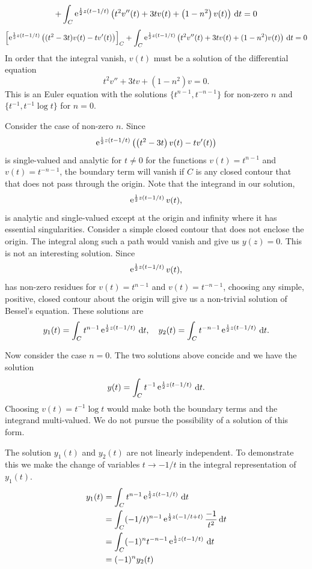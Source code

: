 {\begin{Solution}
\begin{multline*}
    \\
    + \int_C \mathop{\mathrm{e}}\nolimits^{ \frac{1}{2} z (t - 1/t) } \left(
      t^2 v''(t) + 3 t v(t) + \left( 1-n^2 \right) v(t)
    \right) \,\mathrm{d} t = 0
  \end{multline*}
  \[
    \left[ \mathop{\mathrm{e}}\nolimits^{ \frac{1}{2} z (t - 1/t) }
      \left( (t^2 - 3 t) v(t) - t v'(t) \right) \right]_C
    + \int_C \mathop{\mathrm{e}}\nolimits^{ \frac{1}{2} z (t - 1/t) } \left(
      t^2 v''(t) + 3 t v(t) + (1-n^2) v(t) \right) \,\mathrm{d} t = 0
  \]
  In order that the integral vanish, $v(t)$ must be a solution of the
  differential equation
  \[
  t^2 v'' + 3 t v + \left( 1 - n^2 \right) v = 0.
  \]
  This is an Euler equation with the solutions $\{ t^{n-1}, t^{-n-1} \}$
  for non-zero $n$ and $\{ t^{-1}, t^{-1} \log t \}$ for $n = 0$.

  Consider the case of non-zero $n$.  Since
  \[
  \mathop{\mathrm{e}}\nolimits^{ \frac{1}{2} z (t - 1/t) } \left( \left( t^2 - 3 t \right) v(t) - t v'(t) \right)
  \]
  is single-valued and analytic for $t \neq 0$ for the functions
  $v(t) = t^{n-1}$ and $v(t) = t^{-n-1}$, the boundary
  term will vanish if $C$ is any closed contour that that does not pass
  through the origin.  Note that the integrand in our solution,
  \[
  \mathop{\mathrm{e}}\nolimits^{ \frac{1}{2} z (t - 1/t) } v(t),
  \]
  is analytic and single-valued except at the origin and infinity where
  it has essential singularities.  Consider a simple closed contour that
  does not enclose the origin.  The integral along such a path would vanish
  and give us $y(z) = 0$.  This is not an interesting solution.
  Since
  \[
  \mathop{\mathrm{e}}\nolimits^{ \frac{1}{2} z (t - 1/t) } v(t),
  \]
  has non-zero residues for $v(t) = t^{n-1}$ and $v(t) = t^{-n-1}$, choosing
  any simple, positive, closed contour about the origin will give us
  a non-trivial solution of Bessel's equation.  These solutions are
  \[
  y_1(t) = \int_C t^{n-1} \mathop{\mathrm{e}}\nolimits^{ \frac{1}{2} z (t - 1/t) }\,\mathrm{d} t,
  \quad
  y_2(t) = \int_C t^{-n-1} \mathop{\mathrm{e}}\nolimits^{ \frac{1}{2} z (t - 1/t) }\,\mathrm{d} t.
  \]

  Now consider the case $n = 0$.  The two solutions above concide and we
  have the solution
  \[
  y(t) = \int_C t^{-1} \mathop{\mathrm{e}}\nolimits^{ \frac{1}{2} z (t - 1/t) }\,\mathrm{d} t.
  \]
  Choosing $v(t) = t^{-1} \log t$ would make both the boundary terms and
  the integrand multi-valued.   We do not pursue the possibility of a
  solution of this form.

  The solution $y_1(t)$ and $y_2(t)$ are not linearly independent.  To
  demonstrate this we make the change of variables $t \to -1/t$ in the
  integral representation of $y_1(t)$.
  \begin{align*}
    y_1(t)
    &= \int_C t^{n-1} \mathop{\mathrm{e}}\nolimits^{ \frac{1}{2} z (t - 1/t) }\,\mathrm{d} t 
    \\
    &= \int_C (-1/t)^{n-1} \mathop{\mathrm{e}}\nolimits^{ \frac{1}{2} z (-1/t + t) } \frac{-1}{t^2} \,\mathrm{d} t 
    \\
    &= \int_C (-1)^{n} t^{-n-1} \mathop{\mathrm{e}}\nolimits^{ \frac{1}{2} z (t - 1/t) }\,\mathrm{d} t 
    \\
    &= (-1)^n y_2(t)
  \end{align*}


\end{Solution}}
